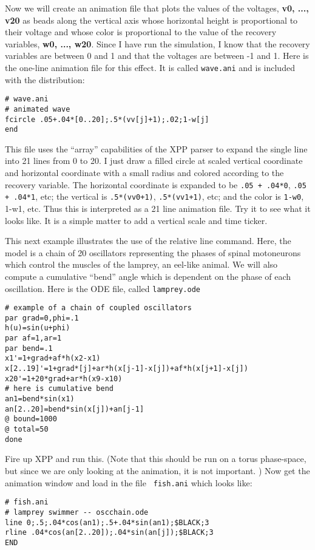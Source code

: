 \documentclass{article}
\begin{document}
Now we will create an animation file that plots the values of the
voltages, {\bf v0, ..., v20}
 as beads along the vertical axis whose horizontal height is
proportional to their voltage and whose color is proportional to the
value of the recovery variables, {\bf w0, ..., w20}. Since I have run
the simulation, I know that the recovery variables are between 0 and 1
and that the voltages are between -1 and 1.  Here is the one-line
animation file for this effect. It is called {\tt wave.ani} and is
included with the distribution:
\begin{verbatim}
# wave.ani
# animated wave
fcircle .05+.04*[0..20];.5*(vv[j]+1);.02;1-w[j]
end
\end{verbatim}
This file uses the ``array'' capabilities of the XPP parser to expand
the single line into 21 lines from 0 to 20. I just draw a filled
circle at scaled vertical coordinate and horizontal coordinate with a
small radius and colored according to the recovery variable. The
horizontal coordinate is expanded to be {\tt .05 + .04*0}, {\tt .05 +
.04*1}, etc; the vertical is {\tt .5*(vv0+1)}, {\tt .5*(vv1+1)}, etc;
and the color is {\tt 1-w0}, {1-w1}, etc. Thus this is interpreted as
a 21 line animation file.  Try it to see what it looks like. It is a
simple matter to add a vertical scale and time ticker.

\medskip

This next example illustrates the use of the relative line
command. Here, the model is a chain of 20 oscillators representing the
phases of spinal motoneurons which control the muscles of the lamprey,
an eel-like animal.  We will also compute a cumulative ``bend'' angle
which is dependent on the phase of each oscillation. Here is the ODE
file, called {\tt lamprey.ode}
\begin{verbatim}
# example of a chain of coupled oscillators
par grad=0,phi=.1
h(u)=sin(u+phi)
par af=1,ar=1
par bend=.1
x1'=1+grad+af*h(x2-x1)
x[2..19]'=1+grad*[j]+ar*h(x[j-1]-x[j])+af*h(x[j+1]-x[j])
x20'=1+20*grad+ar*h(x9-x10)
# here is cumulative bend
an1=bend*sin(x1)
an[2..20]=bend*sin(x[j])+an[j-1]
@ bound=1000
@ total=50
done
\end{verbatim}

Fire up XPP and run this. (Note that this should be run on a torus
phase-space, but since we are only looking at the animation, it is not
important. ) Now get the animation window and load in the file {\tt
fish.ani} which looks like:
\begin{verbatim}
# fish.ani
# lamprey swimmer -- oscchain.ode
line 0;.5;.04*cos(an1);.5+.04*sin(an1);$BLACK;3
rline .04*cos(an[2..20]);.04*sin(an[j]);$BLACK;3
END
\end{verbatim}
\end{document}
